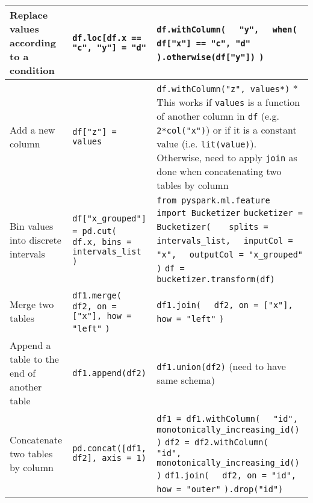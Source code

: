 \documentclass{article}
\begin{document}
\begin{longtable}[l]{| p{} | p{} | p{} |}
Replace values according to a condition &
\verb|df.loc[df.x == "c", "y"] = "d"| &
\verb|df.withColumn(| \newline
\verb|  "y",| \newline
\verb|  when(| \newline
\verb|    df["x"] == "c", "d"| \newline
\verb|  ).otherwise(df["y"])| \newline
\verb|)| \\
\hline

Add a new column &
\verb|df["z"] = values| &
\verb|df.withColumn("z", values*)| \newline
* This works if \verb|values| is a function of another column in \verb|df| (e.g. \verb|2*col("x")|) or if it is a constant value (i.e. \verb|lit(value)|). Otherwise, need to apply \verb|join| as done when concatenating two tables by column \\
\hline

Bin values into discrete intervals &
\verb|df["x_grouped"] = pd.cut(| \newline
\verb|  df.x, bins = intervals_list| \newline
\verb|)| &
\verb|from pyspark.ml.feature import Bucketizer| \newline
\verb|bucketizer = Bucketizer( |\newline
\verb|  splits = intervals_list,| \newline
\verb|  inputCol = "x",| \newline
\verb|  outputCol = "x_grouped"| \newline
\verb|)| \newline
\verb|df = bucketizer.transform(df)| \\
\hline

Merge two tables & 
\verb|df1.merge(| \newline
\verb|  df2, on = ["x"], how = "left"| \newline
\verb|)| &
\verb|df1.join(| \newline
\verb|  df2, on = ["x"], how = "left"| \newline
\verb|)| \\
\hline

Append a table to the end of another table & 
\verb|df1.append(df2)| &
\verb|df1.union(df2)| (need to have same schema) \\
\hline

Concatenate two tables by column & 
\verb|pd.concat([df1, df2], axis = 1)| &
\verb|df1 = df1.withColumn(| \newline
\verb|  "id", monotonically_increasing_id()| \newline
\verb|)| \newline
\verb|df2 = df2.withColumn(| \newline
\verb|  "id", monotonically_increasing_id()| \newline
\verb|)| \newline
\verb|df1.join(| \newline
\verb|  df2, on = "id", how = "outer"| \newline
\verb|).drop("id")| \\
\hline


\end{longtable}
\end{document}
